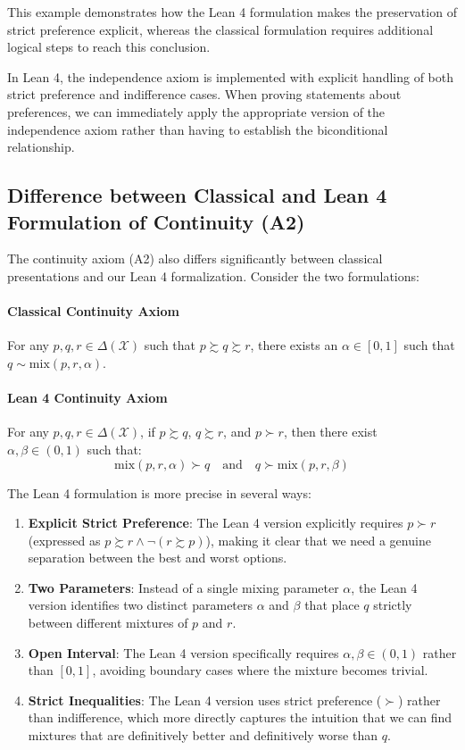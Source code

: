 \documentclass{article}
\theoremstyle{definition}
\newcommand{\X}{\mathcal{X}}
\newcommand{\DeltaX}{\Delta(\X)} %
\newcommand{\pref}{\succsim} %
\newcommand{\strictpref}{\succ} %
\newcommand{\indiff}{\sim} %
\newcommand{\mix}{\mathrm{mix}} %
\begin{document}
This example demonstrates how the Lean 4 formulation makes the preservation of strict preference explicit, whereas the classical formulation requires additional logical steps to reach this conclusion.

In Lean 4, the independence axiom is implemented with explicit handling of both strict preference and indifference cases.  When proving statements about preferences, we can immediately apply the appropriate version of the independence axiom rather than having to establish the biconditional relationship.

\subsection{Difference between Classical and Lean 4 Formulation of Continuity (A2)}

The continuity axiom (A2) also differs significantly between classical presentations and our Lean 4 formalization. Consider the two formulations:

\paragraph{Classical Continuity Axiom}
For any $p, q, r \in \DeltaX$ such that $p \pref q \pref r$, there exists an $\alpha \in [0,1]$ such that $q \indiff \mix(p, r, \alpha)$.

\paragraph{Lean 4 Continuity Axiom}
For any $p, q, r \in \DeltaX$, if $p \pref q$, $q \pref r$, and $p \strictpref r$, then there exist $\alpha, \beta \in (0,1)$ such that:
\[ \mix(p, r, \alpha) \strictpref q \quad \text{and} \quad q \strictpref \mix(p, r, \beta) \]

The Lean 4 formulation is more precise in several ways:

\begin{enumerate}
    \item \textbf{Explicit Strict Preference}: The Lean 4 version explicitly requires $p \strictpref r$ (expressed as $p \pref r \wedge \neg(r \pref p)$), making it clear that we need a genuine separation between the best and worst options.

    \item \textbf{Two Parameters}: Instead of a single mixing parameter $\alpha$, the Lean 4 version identifies two distinct parameters $\alpha$ and $\beta$ that place $q$ strictly between different mixtures of $p$ and $r$.

    \item \textbf{Open Interval}: The Lean 4 version specifically requires $\alpha, \beta \in (0,1)$ rather than $[0,1]$, avoiding boundary cases where the mixture becomes trivial.

    \item \textbf{Strict Inequalities}: The Lean 4 version uses strict preference ($\strictpref$) rather than indifference, which more directly captures the intuition that we can find mixtures that are definitively better and definitively worse than $q$.
\end{enumerate}
\end{document}
